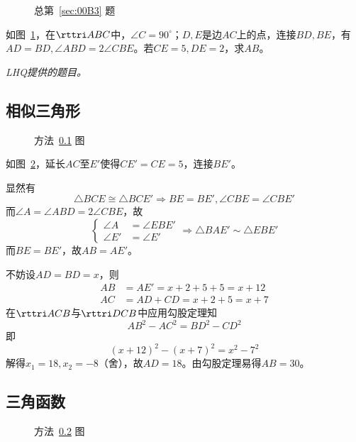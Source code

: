 

\begin{figure}[htbp]
  \centering {}
  \caption{总第~\ref{sec:00B3} 题} \label{fig:00B3}
\end{figure}

如图~\ref{fig:00B3}，在$\rttri ABC$中，$\angle C = 90^\circ$；$D, E$是边$AC$上的点，连接$BD, BE$，有$AD = BD, \angle ABD = 2\angle CBE$。若$CE = 5, DE = 2$，求$AB$。

\emph{LHQ提供的题目。}


\subsection{相似三角形} \label{subsec:00B3-sim}

\begin{figure}[htbp]
  \centering {}
  \caption{方法~\ref{subsec:00B3-sim} 图} \label{fig:00B3-sim}
\end{figure}

如图~\ref{fig:00B3-sim}，延长$AC$至$E'$使得$CE' = CE = 5$，连接$BE'$。

显然有
\[ \triangle BCE \cong \triangle BCE' \Rightarrow BE = BE', \angle CBE = \angle CBE' \]
而$\angle A = \angle ABD = 2\angle CBE$，故
\[ \left\{ \begin{aligned}
  \angle A &= \angle EBE' \\ \angle E' &= \angle E'
\end{aligned} \right. \Rightarrow \triangle BAE' \sim \triangle EBE' \]
而$BE = BE'$，故$AB = AE'$。

不妨设$AD = BD = x$，则
\begin{align*}
  AB &= AE' = x + 2 + 5 + 5 = x + 12 \\
  AC &= AD + CD = x + 2 + 5 = x + 7
\end{align*}
在$\rttri ACB$与$\rttri DCB$中应用勾股定理知
\[ AB^2 - AC^2 = BD^2 - CD^2 \]
即
\[ (x + 12)^2 - (x + 7)^2 = x^2 - 7^2 \]
解得$x_1 = 18, x_2 = -8$（舍），故$AD = 18$。由勾股定理易得$AB = 30$。

\subsection{三角函数} \label{subsec:00B3-tri}

\begin{figure}[htbp]
  \centering {}
  \caption{方法~\ref{subsec:00B3-tri} 图} \label{fig:00B3-tri}
\end{figure}

